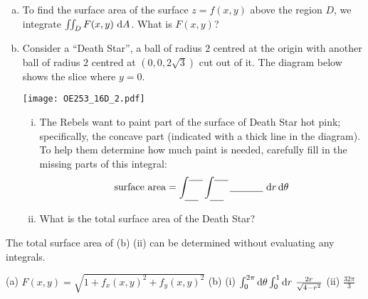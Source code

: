 \begin{question}[M253 2016D] %
\begin{enumerate}[(a)]
\item
To find the surface area of the surface $z = f (x,y)$ above the region $D$, 
we integrate $\dblInt_D F(x,y)\ \dee{A}$. What is $F(x,y)$?
\item
Consider a ``Death Star'',  a ball of radius $2$ centred at the origin 
with another ball of radius $2$ centred at $(0, 0, 2\sqrt{3})$ cut out of it. 
The diagram below shows the slice where $y = 0$.

\begin{center}
     \texttt{[image: OE253\_16D\_2.pdf]}
\end{center}

\begin{enumerate}[(i)]
\item
The Rebels want to paint part of the surface of Death Star hot pink; specifically, the concave part (indicated with a thick line in the diagram). 
To help them determine how much paint is needed, carefully fill in the 
missing parts of this integral:
\begin{equation*}
\text{surface area} = 
\int_{\underline{\ \ \ \ }}^{\underline{\ \ \ \ }}
                 \int_{\underline{\ \ \ \ }}^{\underline{\ \ \ \ }}
                        \underline{\ \ \ \ \ \ \ \ \ \ }\ \dee{r}\,\dee{\theta}
\end{equation*}

\item
What is the total surface area of the Death Star?
\end{enumerate}
\end{enumerate}
\end{question}

\begin{hint}
The total surface area of (b) (ii) can be determined without evaluating
any integrals.
\end{hint}

\begin{answer}
(a)  $F(x,y) = \sqrt{1+f_x(x,y)^2+f_y(x,y)^2}$
\qquad
(b) (i) $\int_0^{2\pi}\dee{\theta}\int_0^1\dee{r}\ \frac{2r}{\sqrt{4-r^2}}$ 
\qquad (ii) $\frac{32\pi}{3}$
\end{answer}

